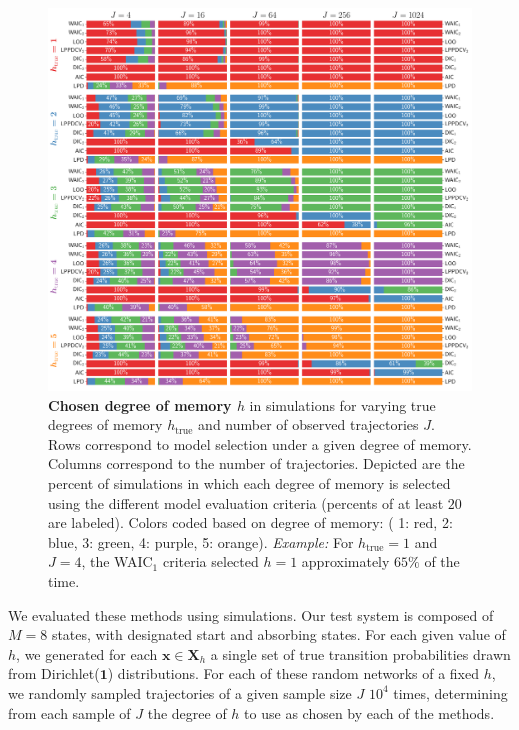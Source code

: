 \documentclass[prl,twocolumn,groupedaddress]{revtex4-1}
\newcommand{\bx}{\mathbf{x}}
\begin{document}
\begin{figure}[!ht]
\includegraphics[width=\textwidth]{fig2b}
\caption{\textbf{Chosen degree of memory $h$} in simulations for varying true degrees of memory  $h_{\textrm{true}}$ and number of observed trajectories $J$. Rows correspond to model selection under a given degree of memory. Columns correspond to the number of trajectories. Depicted are the percent of simulations in which each degree of memory is selected using the different model evaluation criteria (percents of at least $20$ are labeled). Colors coded based on degree of memory: ({\color{Set1_5_red} 1: red}, {\color{Set1_5_blue} 2: blue}, {\color{Set1_5_green}3: green}, {\color{Set1_5_purple}4: purple}, {\color{Set1_5_orange}5: orange}). \emph{Example:} For $h_{\textrm{true}}=1$ and $J=4$, the WAIC$_1$ criteria selected $h=1$ approximately $65\%$ of the time. }
\label{fig:fig2}
\end{figure}


We evaluated these methods using simulations. Our test system is composed of $M=8$ states, with designated start and absorbing states.  For each given value of $h$, we generated for each $\bx\in \mathbf{X}_h$ a single set of true transition probabilities drawn from Dirichlet($\mathbf{1}$) distributions. For each of these random networks of a fixed $h$, we randomly sampled trajectories of a given sample size $J$ $10^4$ times, determining from each sample of $J$ the degree of $h$ to use as chosen by each of the methods.
\end{document}
